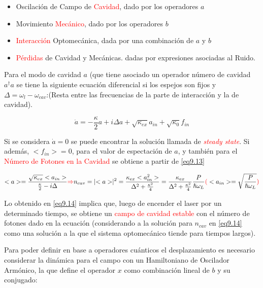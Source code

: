 \documentclass{book}
\begin{document}
\begin{itemize}
    \item Oscilación de Campo de \textcolor{red}{Cavidad}, dado por los operadores $a$
    \item Movimiento \textcolor{red}{Mecánico}, dado por los operadores $b$
    \item \textcolor{red}{Interacción} Optomecánica, dada por una combinación de $a$ y $b$
    \item \textcolor{red}{Pérdidas} de Cavidad y Mecánicas. dadas por expresiones asociadas al Ruido.
\end{itemize}

Para el modo de cavidad $a$ (que tiene asociado un operador número de cavidad $a^\dag a$ se tiene la siguiente ecuación diferencial si los espejos son fijos y $\Delta=\omega_l-\omega_{cav}$:(Resta entre las frecuencias de la parte de interacción y la de cavidad).

\begin{equation}\label{eq9.13}\dot{a}=-\frac{\kappa}{2} a+i\Delta a +\sqrt{\kappa_{ex}}a_{in}+\sqrt{\kappa_0}f_{in}\end{equation}

Si se considera $\dot{a}=0$ se puede encontrar la solución llamada de \textcolor{red}{\textit{steady state}}. Si además, $<f_{in}>=0$, para el valor de espectación de $a$, y también para el \textcolor{red}{Número de Fotones en la Cavidad} se obtiene a partir de \ref{eq9.13} 

\begin{equation}\label{eq9.14}<a>=\frac{\sqrt{\kappa_{ex}}<a_{in}>}{\frac{\kappa}{2}-i\Delta} \textcolor{red}{\Rightarrow} n_{cav}=\lvert<a>\rvert^2=\frac{\kappa_{ex}<a_{in}^2>}{\Delta^2+\frac{\kappa^2}{4}}=\frac{\kappa_{ex}}{\Delta^ 2+\frac{\kappa^2}{4}}\frac{P}{\hslash\omega_L}\textcolor{red}{(}<a_{in}>=\sqrt{\frac{P}{\hslash\omega_L}}\textcolor{red}{)}\end{equation}

Lo obtenido en \ref{eq9.14} implica que, luego de encender el laser por un determinado tiempo, se obtiene un \textcolor{red}{campo de cavidad estable} con el número de fotones dado en la ecuación (considerando a la solución para $n_{cav}$ en \ref{eq9.14} como una solución a la que el sistema optomecánico tiende para tiempos largos).

Para poder definir en base a operadores cuánticos el desplazamiento es necesario considerar la dinámica para el campo con un Hamiltoniano de Oscilador Armónico, la que define el operador $x$ como combinación lineal de $b$ y su conjugado:
\end{document}
